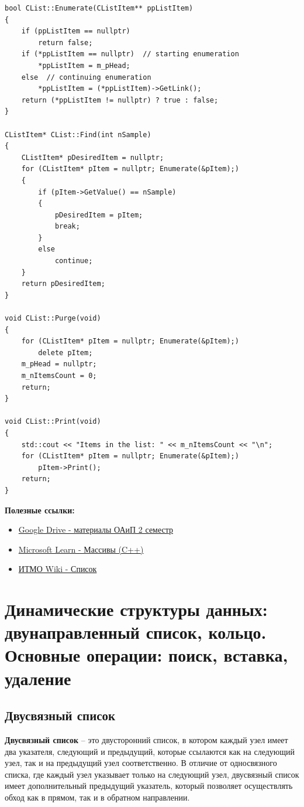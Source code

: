 \begin{verbatim}
bool CList::Enumerate(CListItem** ppListItem)
{
    if (ppListItem == nullptr)
        return false;
    if (*ppListItem == nullptr)  // starting enumeration
        *ppListItem = m_pHead;
    else  // continuing enumeration
        *ppListItem = (*ppListItem)->GetLink();
    return (*ppListItem != nullptr) ? true : false;
}

CListItem* CList::Find(int nSample)
{
    CListItem* pDesiredItem = nullptr;
    for (CListItem* pItem = nullptr; Enumerate(&pItem);)
    {
        if (pItem->GetValue() == nSample)
        {
            pDesiredItem = pItem;
            break;
        }
        else
            continue;
    }
    return pDesiredItem;
}

void CList::Purge(void)
{
    for (CListItem* pItem = nullptr; Enumerate(&pItem);)
        delete pItem;
    m_pHead = nullptr;
    m_nItemsCount = 0;
    return;
}

void CList::Print(void)
{
    std::cout << "Items in the list: " << m_nItemsCount << "\n";
    for (CListItem* pItem = nullptr; Enumerate(&pItem);)
        pItem->Print();
    return;
}
\end{verbatim}

\textbf{Полезные ссылки:}
\begin{itemize}
    \item \href{https://drive.google.com/drive/folders/1EClc2YdBxoKuk4g1VPfmMlzmHIsJwC35}{Google Drive - материалы ОАиП 2 семестр}
    \item \href{https://learn.microsoft.com/ru-ru/cpp/cpp/arrays-cpp?view=msvc-170}{Microsoft Learn - Массивы (C++)}
    \item \href{https://neerc.ifmo.ru/wiki/index.php?title=%D0%A1%D0%BF%D0%B8%D1%81%D0%BE%D0%BA}{ИТМО Wiki - Список}
\end{itemize}
\section{Динамические структуры данных: двунаправленный список, кольцо. Основные операции: поиск, вставка, удаление}
\subsection{Двусвязный список}

\textbf{Двусвязный список} -- это двусторонний список, в котором каждый узел имеет два указателя, следующий и предыдущий, которые ссылаются как на следующий узел, так и на предыдущий узел соответственно. В отличие от односвязного списка, где каждый узел указывает только на следующий узел, двусвязный список имеет дополнительный предыдущий указатель, который позволяет осуществлять обход как в прямом, так и в обратном направлении.


